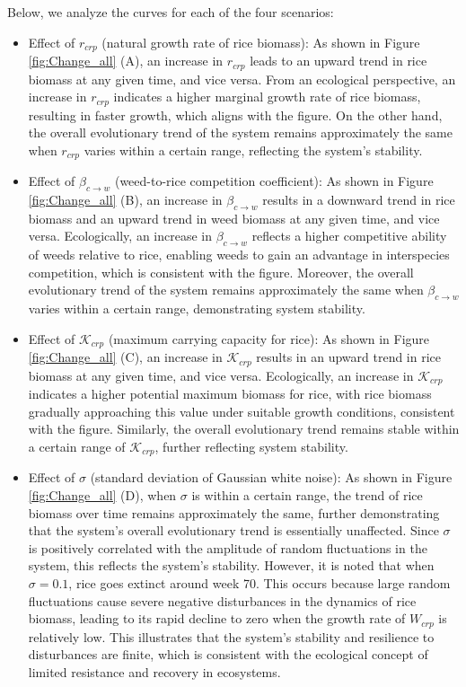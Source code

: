 \documentclass{HZNUMCM}
\begin{document}
    Below, we analyze the curves for each of the four scenarios:
    \begin{itemize}
      \item Effect of \( r_{crp} \) (natural growth rate of rice biomass): 
      As shown in Figure \ref{fig:Change_all} (A), an increase in \( r_{crp} \) leads to an upward trend in rice biomass at any given time, and vice versa. 
      From an ecological perspective, an increase in \( r_{crp} \) indicates a higher marginal growth rate of rice biomass, resulting in faster growth, 
      which aligns with the figure. On the other hand, 
      the overall evolutionary trend of the system remains approximately the same when \( r_{crp} \) varies within a certain range, 
      reflecting the system's stability.
      \item Effect of \( \beta_{c\rightarrow w} \) (weed-to-rice competition coefficient): As shown in Figure \ref{fig:Change_all} (B), 
      an increase in \( \beta_{c\rightarrow w} \) results in a downward trend in rice biomass and an upward trend in weed biomass at any given time, 
      and vice versa. Ecologically, an increase in \( \beta_{c\rightarrow w} \) reflects a higher competitive ability of weeds relative to rice, 
      enabling weeds to gain an advantage in interspecies competition, which is consistent with the figure. 
      Moreover, the overall evolutionary trend of the system remains approximately the same when \( \beta_{c\rightarrow w} \) varies within a certain range, 
      demonstrating system stability.
      \item Effect of \( \mathscr{K}_{crp} \) (maximum carrying capacity for rice): As shown in Figure \ref{fig:Change_all} (C), 
      an increase in \( \mathscr{K}_{crp} \) results in an upward trend in rice biomass at any given time, and vice versa. 
      Ecologically, an increase in \( \mathscr{K}_{crp} \) indicates a higher potential maximum biomass for rice, 
      with rice biomass gradually approaching this value under suitable growth conditions, consistent with the figure. 
      Similarly, the overall evolutionary trend remains stable within a certain range of \( \mathscr{K}_{crp} \), further reflecting system stability.
      \item Effect of \( \sigma \) (standard deviation of Gaussian white noise): As shown in Figure \ref{fig:Change_all} (D), 
      when \( \sigma \) is within a certain range, the trend of rice biomass over time remains approximately the same, 
      further demonstrating that the system's overall evolutionary trend is essentially unaffected. 
      Since \( \sigma \) is positively correlated with the amplitude of random fluctuations in the system, 
      this reflects the system's stability. However, it is noted that when \( \sigma = 0.1 \), rice goes extinct around week 70. 
      This occurs because large random fluctuations cause severe negative disturbances in the dynamics of rice biomass, 
      leading to its rapid decline to zero when the growth rate of \( W_{crp} \) is relatively low. 
      This illustrates that the system's stability and resilience to disturbances are finite, 
      which is consistent with the ecological concept of limited resistance and recovery in ecosystems.
    \end{itemize}
\end{document}

